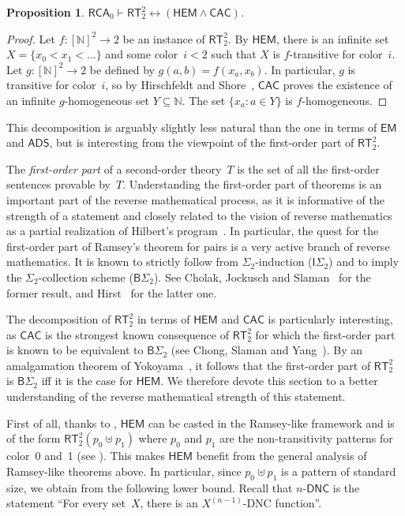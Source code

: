 \documentclass{article}
\newcommand{\isig}{\mathsf{I}\Sigma}
\newcommand{\bsig}{\mathsf{B}\Sigma}
\newcommand{\RCA}[0]{\mathsf{RCA}}
\newcommand{\CAC}[0]{\mathsf{CAC}}
\newcommand{\ADS}[0]{\mathsf{ADS}}
\newcommand{\EM}[0]{\mathsf{EM}}
\newcommand{\RT}[0]{\mathsf{RT}}
\newcommand{\NN}[0]{\mathbb{N}}
\def\qt#1{``#1''}%
\def\NN{\mathbb{N}}
\newcommand{\DNCS}[1]{#1\mbox{-}\mathsf{DNC}}
\newcommand{\HEM}{\mathsf{HEM}}
\def\qt#1{``#1''}%
\numberwithin{theorem}{section}
\newtheorem{proposition}[theorem]{Proposition}
\theoremstyle{definition}
\begin{document}
\begin{proposition}
$\RCA_0 \vdash \RT^2_2 \leftrightarrow (\HEM \wedge \CAC)$.
\end{proposition}
\begin{proof}
Let $f : [\NN]^2 \to 2$ be an instance of $\RT^2_2$.
By $\HEM$, there is an infinite set $X = \{ x_0 < x_1 < \dots \}$ and some color~$i < 2$ such that $X$ is $f$-transitive for color~$i$.
Let $g : [\NN]^2 \to 2$ be defined by $g(a, b) = f(x_a, x_b)$.
In particular, $g$ is transitive for color~$i$, so by Hirschfeldt and Shore~\cite[Theorem 5.2]{Hirschfeldt2007CombinatorialPW}, $\CAC$ proves the existence of an infinite $g$-homogeneous set $Y \subseteq \NN$.
The set $\{ x_a : a \in Y \}$ is $f$-homogeneous.
\end{proof}

This decomposition is arguably slightly less natural than the one in terms of $\EM$ and $\ADS$, but is interesting from the viewpoint of the first-order part of $\RT^2_2$.

The \emph{first-order part} of a second-order theory~$T$ is the set of all the first-order sentences provable by~$T$. Understanding the first-order part of theorems is an important part of the reverse mathematical process, as it is informative of the strength of a statement and closely related to the vision of reverse mathematics as a partial realization of Hilbert's program~\cite{simpson_partial_1988}. In particular, the quest for the first-order part of Ramsey's theorem for pairs is a very active branch of reverse mathematics. It is known to strictly follow from $\Sigma_2$-induction ($\isig_2$) and to imply the $\Sigma_2$-collection scheme ($\bsig_2$). See Cholak, Jockusch and Slaman~\cite{cholak_jockusch_slaman_2001} for the former result, and Hirst~\cite{hirst1987combinatorics} for the latter one.

The decomposition of $\RT^2_2$ in terms of $\HEM$ and $\CAC$ is particularly interesting, as $\CAC$ is the strongest known consequence of $\RT^2_2$ for which the first-order part is known to be equivalent to $\bsig_2$ (see Chong, Slaman and Yang~\cite{chong2021pi11}). By an amalgamation theorem of Yokoyama~\cite{yokoyama_pi_11_2010}, it follows that the first-order part of $\RT^2_2$ is $\bsig_2$ iff it is the case for $\HEM$. We therefore devote this section to a better understanding of the reverse mathematical strength of this statement.

First of all, thanks to , $\HEM$ can be casted in the Ramsey-like framework and is of the form $\RT^2_2(p_0 \uplus p_1)$ where $p_0$ and $p_1$ are the non-transitivity patterns for color~0 and~1 (see ). This makes $\HEM$ benefit from the general analysis of Ramsey-like theorems above. In particular, since $p_0 \uplus p_1$ is a pattern of standard size, we obtain from  the following lower bound. Recall that $\DNCS{n}$ is the statement \qt{For every set~$X$, there is an $X^{(n-1)}$-DNC function}.
\end{document}
